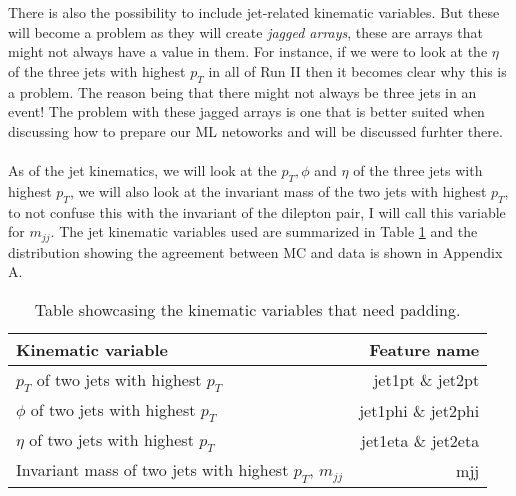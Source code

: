 \documentclass[14pt, a4paper]{book}
\begin{document}
\clearpage\noindent There is also the possibility to include jet-related kinematic variables. But these will become a problem as they will create \textit{jagged arrays}, these are arrays that might not always have a value in them.
For instance, if we were to look at the $\eta$ of the three jets with highest $p_T$ in all of Run II then it becomes clear why this is a problem. The reason being that there might not always be three jets in an event!
The problem with these jagged arrays is one that is better suited when discussing how to prepare our ML netoworks and will be discussed furhter there. \\
\\As of the jet kinematics, we will look at the $p_T, \phi$ and $\eta$ of the three jets with highest $p_T$, we will also look at the invariant mass of the two jets with highest $p_T$, 
to not confuse this with the invariant of the dilepton pair, I will call this variable for $m_{jj}$. The jet kinematic variables used are summarized in Table \ref{tab:paddable_variables} 
and the distribution showing the agreement between MC and data is shown in Appendix A.
\begin{table}[!h]
    \centering
    \begin{tabular}{l|r}\midrule\midrule
        Kinematic variable                                                      & Feature name          \\\midrule
        $p_T$ of two jets with highest $p_T$                                    & jet1pt \& jet2pt\\
        $\phi$ of two jets with highest $p_T$                                   & jet1phi \& jet2phi\\
        $\eta$ of two jets with highest $p_T$                                   & jet1eta \& jet2eta\\
        Invariant mass of two jets with highest $p_T$, $m_{jj}$                 & mjj\\\midrule\midrule
    \end{tabular}
    \caption[Kinematic variables that need padding]{Table showcasing the kinematic variables that need padding.}
    \label{tab:paddable_variables}
\end{table}
\end{document}
